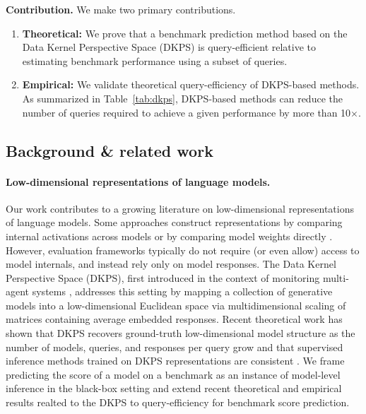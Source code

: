 \noindent \textbf{Contribution.} We make two primary contributions.
\begin{enumerate}[itemsep=0pt, topsep=0pt, parsep=2pt]
\item \textbf{Theoretical:} We prove that a benchmark prediction method based on the Data Kernel Perspective Space (DKPS) is query-efficient relative to estimating benchmark performance using a subset of queries.

\item \textbf{Empirical:} We validate theoretical query-efficiency of DKPS-based methods. 
As summarized in Table~\ref{tab:dkps}, DKPS-based methods can reduce the number of queries required to achieve a given performance by more than 10$\times$.
\end{enumerate}
\subsection{Background \& related work}


\paragraph{Low-dimensional representations of language models.}
Our work contributes to a growing literature on low-dimensional representations of language models. 
Some approaches construct representations by comparing internal activations across models \citep{duderstadt2023comparing, huh2024platonicrepresentationhypothesis, horwitz2025chartatlasworldsmodels} or by comparing model weights directly \citep{chen2025extracting}. 
However, evaluation frameworks typically do not require (or even allow) access to model internals, and instead rely only on model responses.
The Data Kernel Perspective Space (DKPS), first introduced in the context of monitoring multi-agent systems \citep{helm2024tracking}, addresses this setting by mapping a collection of generative models into a low-dimensional Euclidean space via multidimensional scaling of matrices containing average embedded responses. 
Recent theoretical work has shown that DKPS recovers ground-truth low-dimensional model structure as the number of models, queries, and responses per query grow \citep{aranyak,acharyya2025concentrationboundsresponsebasedvector} and that supervised inference methods trained on DKPS representations are consistent \citep{helm-etal-2025-statistical}.
We frame predicting the score of a model on a benchmark as an instance of model-level inference in the black-box setting and extend recent theoretical and empirical results realted to the DKPS to query-efficiency for benchmark score prediction.

